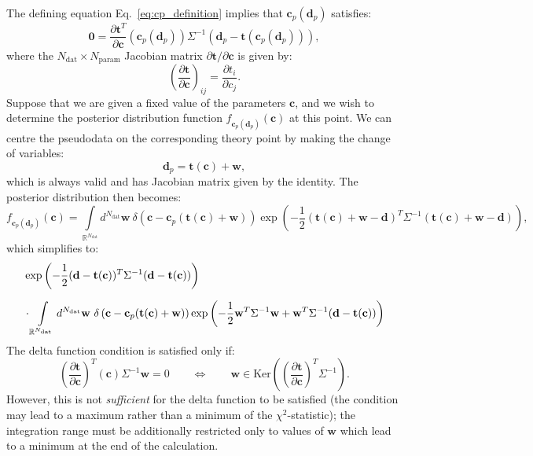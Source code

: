 \documentclass[withindex,glossary]{cam-thesis}
\renewcommand{\vec}[1]{\textbf{#1}} %
\begin{document}
The defining equation Eq.~\eqref{eq:cp_definition} implies that $\vec{c}_p(\vec{d}_p)$ satisfies:
\begin{equation}
\vec{0} = \frac{\partial \vec{t}^T}{\partial \vec{c}} (\vec{c}_p(\vec{d}_p)) \Sigma^{-1} \left( \vec{d}_p - \vec{t}(\vec{c}_p(\vec{d}_p)) \right),
\end{equation}
where the $N_{\text{dat}} \times N_{\text{param}}$ Jacobian matrix $\partial \vec{t} / \partial \vec{c}$ is given by:
\begin{equation}
\left(\frac{\partial \vec{t}}{\partial \vec{c}}\right)_{ij} = \frac{\partial t_i}{\partial c_j}.
\end{equation}
Suppose that we are given a fixed value of the parameters $\vec{c}$, and we wish to determine the posterior distribution function $f_{\vec{c}_p(\vec{d}_p)}(\vec{c})$ at this point. We can centre the pseudodata on the corresponding theory point by making the change of variables:
\begin{equation}
\vec{d}_p = \vec{t}(\vec{c}) + \vec{w},
\end{equation}
which is always valid and has Jacobian matrix given by the identity. The posterior distribution then becomes:
\begin{equation}
f_{\vec{c}_p(\vec{d}_p)}(\vec{c}) = \int\limits_{\mathbb{R}^{N_{\text{dat}}}} d^{N_{\text{dat}}}\vec{w}\ \delta\left(\vec{c} - \vec{c}_p(\vec{t}(\vec{c}) + \vec{w}) \right) \exp\left( -\frac{1}{2} (\vec{t}(\vec{c}) + \vec{w} - \vec{d})^T \Sigma^{-1} (\vec{t}(\vec{c}) + \vec{w} - \vec{d}) \right),
\end{equation}
which simplifies to:
\begin{align}
& \exp\left( -\frac{1}{2}(\vec{d} - \vec{t}(\vec{c}))^T\Sigma^{-1} (\vec{d} - \vec{t}(\vec{c})) \right)\notag\\[1.5ex]
& \cdot \int\limits_{\mathbb{R}^{N_{\text{dat}}}} d^{N_{\text{dat}}}\vec{w}\ \delta\left(\vec{c} - \vec{c}_p(\vec{t}(\vec{c}) + \vec{w}) \right) \exp\left( -\frac{1}{2} \vec{w}^T \Sigma^{-1} \vec{w} + \vec{w}^T \Sigma^{-1} (\vec{d} - \vec{t}(\vec{c})) \right)
\end{align}
The delta function condition is satisfied only if:
\begin{equation}
\left( \frac{\partial \vec{t}}{\partial \vec{c}} \right)^T (\vec{c}) \Sigma^{-1} \vec{w} = 0 \qquad \Leftrightarrow \qquad \vec{w} \in \textrm{Ker}\left( \left( \frac{\partial \vec{t}}{\partial \vec{c}} \right)^T \Sigma^{-1} \right).
\end{equation}
However, this is not \textit{sufficient} for the delta function to be satisfied (the condition may lead to a maximum rather than a minimum of the $\chi^2$-statistic); the integration range must be additionally restricted only to values of $\vec{w}$ which lead to a minimum at the end of the calculation. 
\end{document}
